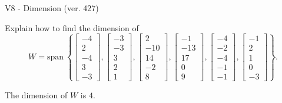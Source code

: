 \begin{exercise}
  \begin{exerciseTitle}V8 - Dimension (ver. 427)\end{exerciseTitle}
  \begin{exerciseStatement}
    Explain how to find the dimension of 
\[W=\mathrm{span}\ \left\{\left[\begin{array}{r}
-4 \\
2 \\
-4 \\
3 \\
-3
\end{array}\right] , \left[\begin{array}{r}
-3 \\
-3 \\
3 \\
2 \\
1
\end{array}\right] , \left[\begin{array}{r}
2 \\
-10 \\
14 \\
-2 \\
8
\end{array}\right] , \left[\begin{array}{r}
-1 \\
-13 \\
17 \\
0 \\
9
\end{array}\right] , \left[\begin{array}{r}
-4 \\
-2 \\
-4 \\
-1 \\
-1
\end{array}\right] , \left[\begin{array}{r}
-1 \\
2 \\
1 \\
0 \\
-3
\end{array}\right]\right\}.\]



  \end{exerciseStatement}
  \begin{exerciseAnswer}
   The dimension of \(W\) is  \(4\).
  


  \end{exerciseAnswer}
\end{exercise}